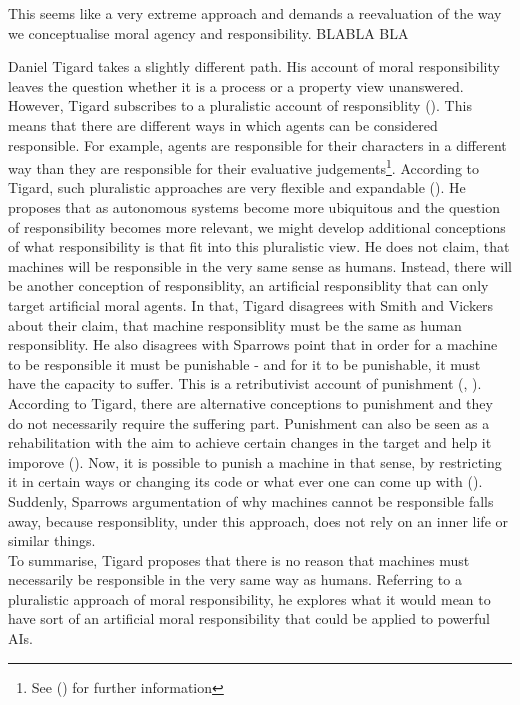 \documentclass{article}
\newcounter{example}
\begin{document}
This seems like a very extreme approach and demands a reevaluation of the way we
conceptualise moral agency and responsibility. BLABLA BLA

Daniel Tigard takes a slightly different path. His account of moral
responsibility leaves the question whether it is a process or a property
view unanswered. However, Tigard subscribes to a pluralistic account of
responsiblity (\cite[p. 442-444]{tigard2021artificial}). This means that there
are different ways in which agents can be considered responsible. For example,
agents are responsible for their characters in a different way than they are
responsible for their evaluative judgements\footnote{See (\cite{Shoemaker_2011})
for further information}. According to Tigard, such pluralistic approaches are
very flexible and expandable (\cite[p. 442-444]{tigard2021artificial}). He
proposes that as autonomous systems become more ubiquitous and the question of
responsibility becomes more relevant, we might develop additional conceptions of
what responsibility is that fit into this pluralistic view. He does not claim, that
machines will be responsible in the very same sense as humans. Instead, there
will be another conception of responsiblity, an artificial responsiblity that
can only target artificial moral agents. In that, Tigard disagrees with Smith
and Vickers about their claim, that machine responsiblity must be the same as
human responsiblity. He also disagrees with Sparrows point that in order for a
machine to be responsible it must be punishable - and for it to be punishable,
it must have the capacity to suffer. This is a retributivist account of
punishment (\cite[p. 77]{sparrow2007killer}, \cite[p.
441]{tigard2021artificial}). According to Tigard, there are alternative
conceptions to punishment and they do not necessarily require the suffering
part. Punishment can also be seen as a rehabilitation with the aim to achieve
certain changes in the target and help it imporove (\cite[p.
442]{tigard2021artificial}). Now, it is possible to punish a machine in that
sense, by restricting it in certain ways or changing its code or what ever one
can come up with (\cite[p. 443]{tigard2021artificial}). Suddenly, Sparrows
argumentation of why machines cannot be responsible falls away, because
responsiblity, under this approach, does not rely on an inner life or similar
things.\\
To summarise, Tigard proposes that there is no reason that machines must
necessarily be responsible in the very same way as humans. Referring to a
pluralistic approach of moral responsibility, he explores what it would mean to
have sort of an artificial moral responsibility that could be applied to
powerful AIs.\\
\end{document}
